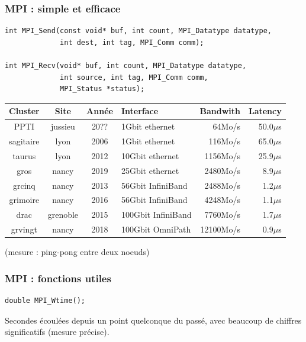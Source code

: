 \documentclass[xcolor={x11names,svgnames}]{beamer}
\begin{document}
\begin{frame}[fragile]
\frametitle{MPI : simple et efficace}

\begin{verbatim}
int MPI_Send(const void* buf, int count, MPI_Datatype datatype,
             int dest, int tag, MPI_Comm comm);

int MPI_Recv(void* buf, int count, MPI_Datatype datatype,
             int source, int tag, MPI_Comm comm,
             MPI_Status *status);
\end{verbatim}

\bigskip

\footnotesize 
\begin{tabular}{|c|c|c|l|r|r|}
  \hline
  Cluster & Site & Année & Interface & Bandwith & Latency \\
  \hline
  \hline
  PPTI      & jussieu & 20?? & \phantom{00}1Gbit ethernet &   64Mo/s & 50.0$\mu$s \\
  sagitaire & lyon  & 2006 & \phantom{00}1Gbit ethernet   &   116Mo/s & 65.0$\mu$s \\
  \pause
  taurus    & lyon  & 2012 & \phantom{0}10Gbit ethernet   &  1156Mo/s & 25.9$\mu$s\\
  \pause
  gros      & nancy & 2019 & \phantom{0}25Gbit ethernet   &  2480Mo/s & 8.9$\mu$s\\
  \hline
  \pause
  grcinq    & nancy & 2013 & \phantom{0}56Gbit InfiniBand &  2488Mo/s & 1.2$\mu$s \\
  \pause
  grimoire  & nancy & 2016 & \phantom{0}56Gbit InfiniBand &  4248Mo/s & 1.1$\mu$s\\
  \pause
  drac      & grenoble & 2015 & 100Gbit InfiniBand  & 7760Mo/s & 1.7$\mu$s \\
  \hline
  \pause
  grvingt   & nancy & 2018 & 100Gbit OmniPath  & 12100Mo/s & 0.9$\mu$s \\
  \hline
\end{tabular}
(mesure : ping-pong entre deux noeuds)
\end{frame}


\begin{frame}[fragile]
\frametitle{MPI : fonctions utiles}

\begin{verbatim}
double MPI_Wtime();
\end{verbatim}
               
\bigskip

Secondes écoulées depuis un point quelconque du passé, avec beaucoup
de chiffres significatifs (mesure précise).
\end{frame}
\end{document}
